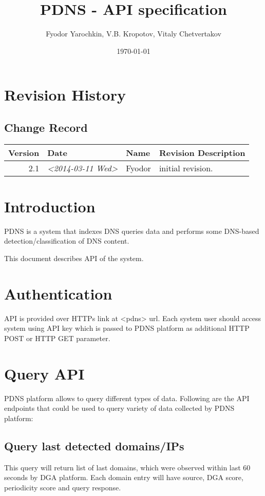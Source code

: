 \documentclass[a4paper]{article}
\author{Fyodor Yarochkin, V.B. Kropotov, Vitaly Chetvertakov}
\date{\today}
\title{PDNS -  API specification}
\begin{document}
\maketitle
\tableofcontents


\section{Revision History}
\label{sec-1}
\subsection{Change Record}
\label{sec-1-1}
\begin{center}
\begin{tabular}{r|l|l|l}
\hline
Version & Date & Name & Revision Description\\
\hline
2.1 & \textit{<2014-03-11 Wed>} & Fyodor & initial revision.\\
\hline
\end{tabular}
\end{center}

\section{Introduction}
\label{sec-2}
PDNS is a system that indexes DNS queries data and performs some
DNS-based detection/classification of DNS content.

This document describes API of the system.
\section{Authentication}
\label{sec-3}
API is provided over HTTPs link at <pdns> url.
Each system user should access system using API key which is passed to
PDNS platform as additional HTTP POST or HTTP GET parameter.

\section{Query API}
\label{sec-4}
PDNS platform allows to query different types of data. Following are
the API endpoints that could be used to query variety of data
collected by PDNS platform:

\subsection{Query last detected domains/IPs}
\label{sec-4-1}
This query will return list of last domains, which were observed
 within last 60 seconds by DGA platform.
 Each domain entry will have source, DGA score, periodicity
score and query response.
\end{document}
